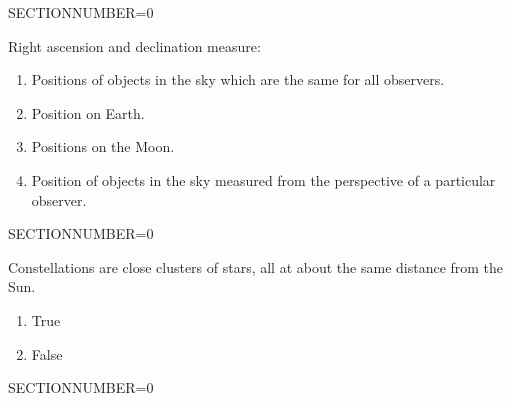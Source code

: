 \documentclass[11pt]{article}
\begin{document}
\begin{enumerate}
\begin{minipage}{\textwidth}
\begin{minipage}{\textwidth}
\end{minipage}
SECTIONNUMBER=0
\end{minipage}
\vskip 0.20in

\begin{minipage}{\textwidth}
\begin{minipage}{\textwidth}
\item Right ascension and declination measure:
\begin{enumerate} 
\setlength{\itemsep}{1pt} 
\setlength{\parskip}{0pt} 
\setlength{\parsep}{0pt}
\setlength{\multicolsep}{1pt} 
\item Positions of objects in the sky which are the same for all observers.
\item Position on Earth.
\item Positions on the Moon.
\item Position of objects in the sky measured from the perspective of a particular observer.
\end{enumerate} 
\end{minipage}
SECTIONNUMBER=0
\end{minipage}
\vskip 0.20in

\begin{minipage}{\textwidth}
\begin{minipage}{\textwidth}
\item Constellations are close clusters of stars, all at about the same distance from the Sun.
\begin{multicols}{3}
\begin{enumerate} 
\setlength{\itemsep}{1pt} 
\setlength{\parskip}{0pt} 
\setlength{\parsep}{0pt}
\setlength{\multicolsep}{1pt} 
\item True
\item False
\end{enumerate} 
\vfill 
\end{multicols}

\end{minipage}
SECTIONNUMBER=0
\end{minipage}
\vskip 0.20in


\end{enumerate}
\end{document}

